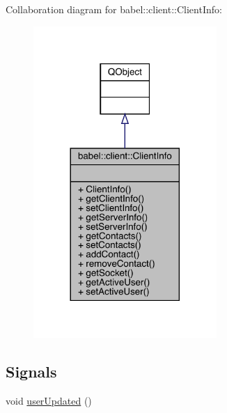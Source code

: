 Collaboration diagram for babel\+:\+:client\+:\+:Client\+Info\+:\nopagebreak
\begin{figure}[H]
\begin{center}
\leavevmode
\includegraphics[width=197pt]{classbabel_1_1client_1_1_client_info__coll__graph}
\end{center}
\end{figure}
\subsection*{Signals}
\begin{DoxyCompactItemize}
\item 
void \mbox{\hyperlink{classbabel_1_1client_1_1_client_info_a20070f1abc949a58f2e532edd4f32f0c}{user\+Updated}} ()
\end{DoxyCompactItemize}
